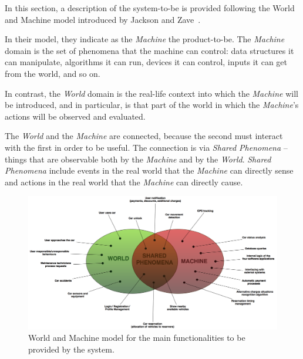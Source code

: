 In this section, a description of the system-to-be is provided following the World and Machine model introduced by Jackson and Zave~\cite{w&m}.

In their model, they indicate as the \textit{Machine} the product-to-be. The \textit{Machine} domain is the set of phenomena that the machine can control: data structures it can manipulate, algorithms it can run, devices it can
control, inputs it can get from the world, and so on.

In contrast, the \textit{World} domain is the real-life context into which the \textit{Machine} will be introduced, and in particular, is that part of the world in which the \textit{Machine}’s actions will be observed and evaluated.

The \textit{World} and the \textit{Machine} are connected, because the second must interact with the first in order to be useful. The connection is via \textit{Shared Phenomena} – things that are observable both by the \textit{Machine} and by the \textit{World}. \textit{Shared Phenomena} include events in the real world that the \textit{Machine} can directly sense and actions in the real world that the \textit{Machine} can directly cause.

\begin{figure}[H]
\begin{center}
		\includegraphics[width=\textwidth]{./pictures/World_and_Machine.png}
		\caption{World and Machine model for the main functionalities to be provided by the system.}
		\label{class_diagram}
\end{center}
\end{figure}